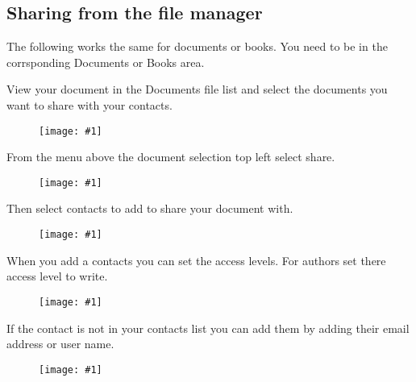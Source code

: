 \documentclass{article}
\newlength{\imgwidth}
\newcommand\scaledgraphics[2]{%
                
\settowidth{\imgwidth}{\texttt{[image: \#1]}}%
                
\setlength{\imgwidth}{\minof{\imgwidth}{#2\textwidth}}%
                
\texttt{[image: \#1]}%
                
}
\begin{document}
\subsection{Sharing from the file manager}\label{H2997562}



The following works the same for documents or books. You need to be in the corrsponding Documents or Books area.


View your document in the Documents file list and select the documents you want to share with your contacts.

\begin{figure}
\scaledgraphics{362aa573-1625-45bd-baee-f0c5adffe267.png}{1}
\label{F28105381}
\end{figure}


From the menu above the document selection top left select share.

\begin{figure}
\scaledgraphics{2c9499b5-4dbd-4925-a2e2-4c4e495a6f9d.png}{1}
\label{F79017051}
\end{figure}


Then select contacts to add to share your document with. 

\begin{figure}
\scaledgraphics{5d7cc003-716e-46a8-83c6-424becc3083f.png}{1}
\label{F6209901}
\end{figure}


When you add a contacts you can set the access levels. For authors set there access level to write.

\begin{figure}
\scaledgraphics{e3157454-6c9a-4f9c-8b39-8bcb38585b99.png}{1}
\label{F75848581}
\end{figure}


If the contact is not in your contacts list you can add them by adding their email address or user name.

\begin{figure}
\scaledgraphics{f89f82a3-4deb-4096-87f4-5e01b2e366c7.png}{1}
\label{F72138101}
\end{figure}
\end{document}
